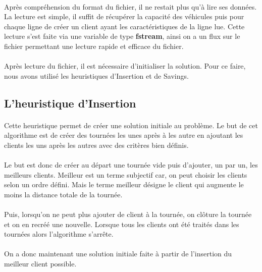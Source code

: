 \documentclass[12pt]{article}
\begin{document}
\paragraph{}
Après compréhension du format du fichier, il ne restait plus qu'à lire ses données. La lecture est simple, il suffit de récupérer la capacité 
des véhicules puis pour chaque ligne de créer un client ayant les caractéristiques de la ligne lue. Cette lecture s'est faite via une variable de
type \textbf{fstream}, ainsi on a un flux sur le fichier permettant une lecture rapide et efficace du fichier.

\paragraph{}
Après lecture du fichier, il est nécessaire d'initialiser la solution. Pour ce faire, nous avons utilisé les heuristiques d'Insertion et de Savings.

\subsection{L'heuristique d'Insertion}

\paragraph{}
Cette heuristique permet de créer une solution initiale au problème. Le but de cet algorithme est de créer des tournées les unes après à les autre en 
ajoutant les clients les uns après les autres avec des critères bien définis.

\paragraph{}
Le but est donc de créer au départ une tournée vide puis d'ajouter, un par un, les meilleurs clients. Meilleur est un terme subjectif car, on peut choisir les 
clients selon un ordre défini. Mais le terme meilleur désigne le client qui augmente le moins la distance totale de la tournée.

\paragraph{}
Puis, lorsqu'on ne peut plus ajouter de client à la tournée, on clôture la tournée et on en recréé une nouvelle. Lorsque tous les clients ont été traités 
dans les tournées alors l'algorithme s'arrête.

\paragraph{}
On a donc maintenant une solution initiale faite à partir de l'insertion du meilleur client possible. 
\end{document}

